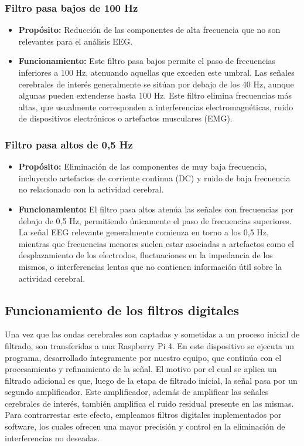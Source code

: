 \documentclass{article}
\begin{document}
\subsubsection{Filtro pasa bajos de 100 Hz}
\begin{itemize}
    \item \textbf{Propósito:} Reducción de las componentes de alta frecuencia que no son relevantes para el análisis EEG.
    \item \textbf{Funcionamiento:} Este filtro pasa bajos permite el paso de frecuencias inferiores a 100 Hz, atenuando aquellas que exceden este umbral. Las señales cerebrales de interés generalmente se sitúan por debajo de los 40 Hz, aunque algunas pueden extenderse hasta 100 Hz. Este filtro elimina frecuencias más altas, que usualmente corresponden a interferencias electromagnéticas, ruido de dispositivos electrónicos o artefactos musculares (EMG).
\end{itemize}
\subsubsection{Filtro pasa altos de 0,5 Hz}
\begin{itemize}
    \item \textbf{Propósito:} Eliminación de las componentes de muy baja frecuencia, incluyendo artefactos de corriente continua (DC) y ruido de baja frecuencia no relacionado con la actividad cerebral.
    \item \textbf{Funcionamiento:} El filtro pasa altos atenúa las señales con frecuencias por debajo de 0,5 Hz, permitiendo únicamente el paso de frecuencias superiores. La señal EEG relevante generalmente comienza en torno a los 0,5 Hz, mientras que frecuencias menores suelen estar asociadas a artefactos como el desplazamiento de los electrodos, fluctuaciones en la impedancia de los mismos, o interferencias lentas que no contienen información útil sobre la actividad cerebral.
\end{itemize}

\subsection{Funcionamiento de los filtros digitales}

Una vez que las ondas cerebrales son captadas y sometidas a un proceso inicial de filtrado, son transferidas a una Raspberry Pi 4. En este dispositivo se ejecuta un programa, desarrollado íntegramente por nuestro equipo, que continúa con el procesamiento y refinamiento de la señal. El motivo por el cual se aplica un filtrado adicional es que, luego de la etapa de filtrado inicial, la señal pasa por un segundo amplificador. Este amplificador, además de amplificar las señales cerebrales de interés, también amplifica el ruido residual presente en las mismas. Para contrarrestar este efecto, empleamos filtros digitales implementados por software, los cuales ofrecen una mayor precisión y control en la eliminación de interferencias no deseadas.
\end{document}
